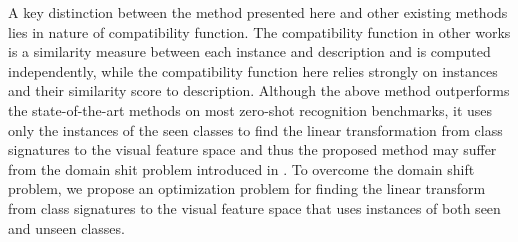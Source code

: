 \documentclass[10pt,twocolumn,letterpaper]{article}
\begin{document}


A key distinction between the method presented here and other existing methods lies in nature of compatibility function. The compatibility function in
other works is a similarity measure between each instance and description and is computed independently, while the compatibility function here
relies strongly on instances and their similarity score to description.
Although the above method outperforms the state-of-the-art methods on most zero-shot recognition benchmarks, it uses only the instances of the seen classes to find the linear transformation from class signatures to the visual feature space and thus the proposed method may suffer from the domain shit problem introduced in \cite{eccv14}.
To overcome the domain shift problem, we propose an optimization problem for finding the linear transform from class signatures to the visual feature space that uses instances of both seen and unseen classes.
\end{document}
